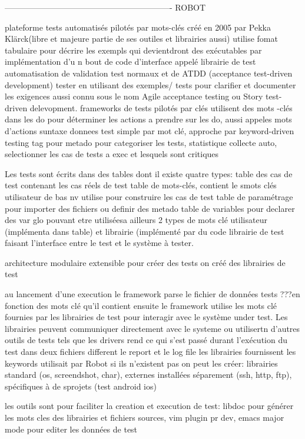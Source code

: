 -------------------------------------------------------------
ROBOT

plateforme tests automatisés pilotés par mots-clés créé en 2005 par Pekka Klärck(libre et majeure partie de ses outiles et librairies aussi)
utilise fomat tabulaire pour décrire les exempls qui devientdront des exécutables par implémentation d'u n  bout de code d'interface appelé librairie de test
automatisation de validation test normaux et de ATDD (acceptance test-driven development)
tester en utilisant des exemples/ tests pour clarifier et documenter les exigences aussi connu sous le nom Agile acceptance testing ou Story test-driven delevopment.
frameworks de tests pilotés par clés utilisent des mots -clés dans les do pour déterminer les actions a prendre sur les do, aussi appeles mots d'actions
suntaxe donnees test simple par mot clé,  approche par keyword-driven testing
tag pour metado pour categoriser les tests, statistique collecte auto, selectionner les cas de tests a exec et lesquels sont critiques

Les tests sont écrits dans des tables dont il existe quatre types:
table des cas de test contenant les cas réels de test
table de mots-clés, contient le smots clés utilisateur de bas nv utilise pour construire les cas de test
table de paramétrage pour importer des fichiers ou definir des metado
table de variables pour declarer des var glo pouvant etre utiliséesa ailleurs
2 types de mots clé utilisateur (implémenta dans table) et librairie (implémenté par du code librairie de test faisant l'interface entre le test et le système à tester.


architecture modulaire extensible
pour créer des tests on créé des librairies de test 

au lancement d'une execution le framework parse le fichier de données tests
???en fonction des mots clé qu'il contient
ensuite le framework utilise les mots clé fournies par les librairies de test
pour interagir avec le système under test. Les librairies peuvent communiquer
directement avec le systeme ou utilisertn d'autres outils de tests tels que les
drivers
rend ce qui s'est passé durant l'exécution du test dans deux fichiers different
le report et le log file
les librairies fournissent les keywords utilisait par Robot si ils n'existent
pas on peut les créer: librairies standard (os, screendshot, char), externes installées séparement (ssh, http, ftp), spécifiques à de sprojets (test android ios)

les outils sont pour faciliter la creation et execution de test: libdoc pour
générer les mots cles des librairies et fichiers sources, vim plugin pr dev,
emacs major mode pour editer les données de test


